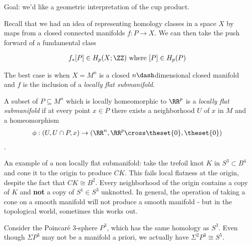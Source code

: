 Goal: we'd like a geometric interpretation of the cup product.

Recall that we had an idea of representing homology classes in a space
\(X\) by maps from a closed connected manifolds \(f: P \to X\). We can
then take the push forward of a fundamental class

\begin{align*}
f_*[P] \in H_p(X; \ZZ) \text{ where } [P] \in H_p(P)
\end{align*}

\begin{remark}

The best case is when \(X = M^n\) is a closed \(n\dash\)dimensional
closed manifold and \(f\) is the inclusion of a \emph{locally flat
submanifold}.

\end{remark}

\begin{definition}[?]

A subset of \(P \subseteq M^n\) which is locally homeomorphic to
\(\RR^p\) is a \emph{locally flat submanifold} if at every point
\(x\in P\) there exists a neighborhood \(U\) of \(x\) in \(M\) and a
homeomorphism
\begin{align*}\phi: (U, U\cap P, x) \to (\RR^n, \RR^p \cross \theset{0}, \theset{0})\end{align*}.

\end{definition}

\begin{warning}

An example of a non locally flat submanifold: take the trefoil knot
\(K\) in \(S^3 \subset B^4\) and cone it to the origin to produce
\(CK\). This fails local flatness at the origin, despite the fact that
\(CK \cong B^2\). Every neighborhood of the origin contains a copy of
\(K\) and \textbf{not} a copy of \(S^1 \in S^3\) unknotted. In general,
the operation of taking a cone on a smooth manifold will not produce a
smooth manifold - but in the topological world, sometimes this works
out.

\end{warning}

\begin{example}

Consider the Poincaré 3-sphere \(P^3\), which has the same homology as
\(S^3\). Even though \(\Sigma P^3\) may not be a manifold a priori, we
actually have \(\Sigma^2 P^3 \cong S^5\).

\end{example}

